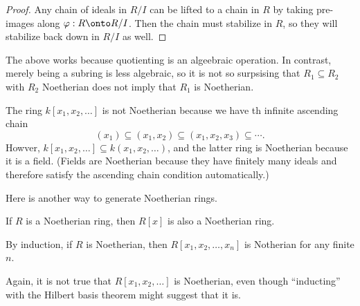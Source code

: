 \begin{proof}
	Any chain of ideals in $R/I$ can be lifted to a chain in $R$ by taking pre-images along $\varphi:R\onto R/I$. Then the chain must stabilize in $R$, so they will stabilize back down in $R/I$ as well.
\end{proof}
The above works because quotienting is an algeebraic operation. In contrast, merely being a subring is less algebraic, so it is not so surpsising that $R_1\subseteq R_2$ with $R_2$ Noetherian does not imply that $R_1$ is Noetherian.
\begin{ex}
	The ring $k[x_1,x_2,\ldots]$ is not Noetherian because we have th infinite ascending chain
	\[(x_1)\subseteq(x_1,x_2)\subseteq(x_1,x_2,x_3)\subseteq\cdots.\]
	Howver, $k[x_1,x_2,\ldots]\subseteq k(x_1,x_2,\ldots)$, and the latter ring is Noetherian because it is a field. (Fields are Noetherian because they have finitely many ideals and therefore satisfy the ascending chain condition automatically.)
\end{ex}
Here is another way to generate Noetherian rings.
\begin{theorem} \label{thm:hilbasis}
	If $R$ is a Noetherian ring, then $R[x]$ is also a Noetherian ring.
\end{theorem}
\begin{corollary} \label{cor:inducthilbertbasis}
	By induction, if $R$ is Noetherian, then $R[x_1,x_2,\ldots,x_n]$ is Notherian for any finite $n$.
\end{corollary}
\begin{warn}
	Again, it is not true that $R[x_1,x_2,\ldots]$ is Noetherian, even though ``inducting'' with the Hilbert basis theorem might suggest that it is.
\end{warn}
